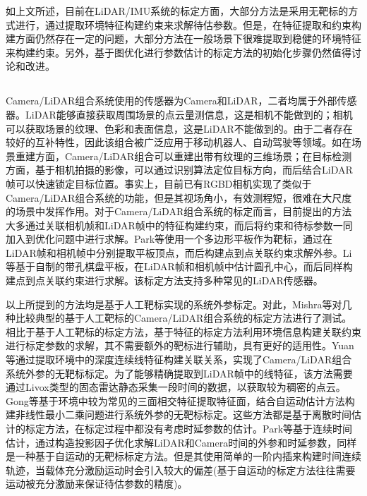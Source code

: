 如上文所述，目前在LiDAR/IMU系统的标定方面，大部分方法是采用无靶标的方式进行，通过提取环境特征构建约束来求解待估参数。但是，在特征提取和约束构建方面仍然存在一定的问题，大部分方法在一般场景下很难提取到稳健的环境特征来构建约束。另外，基于图优化进行参数估计的标定方法的初始化步骤仍然值得讨论和改进。

\subsection{}
Camera/LiDAR组合系统使用的传感器为Camera和LiDAR，二者均属于外部传感器。LiDAR能够直接获取周围场景的点云量测信息，这是相机不能做到的；相机可以获取场景的纹理、色彩和表面信息，这是LiDAR不能做到的。由于二者存在较好的互补特性，因此该组合被广泛应用于移动机器人、自动驾驶等领域。如在场景重建方面，Camera/LiDAR组合可以重建出带有纹理的三维场景；在目标检测方面，基于相机拍摄的影像，可以通过识别算法定位目标方向，而后结合LiDAR帧可以快速锁定目标位置。事实上，目前已有RGBD相机实现了类似于Camera/LiDAR组合系统的功能，但是其视场角小，有效测程短，很难在大尺度的场景中发挥作用\cite{高翔2017视觉}。对于Camera/LiDAR组合系统的标定而言，目前提出的方法大多通过关联相机帧和LiDAR帧中的特征构建约束，而后将约束和待标参数一同加入到优化问题中进行求解。Park等\cite{park2014calibration}使用一个多边形平板作为靶标，通过在LiDAR帧和相机帧中分别提取平板顶点，而后构建点到点关联约束求解外参。Li等\cite{li2022accurate}基于自制的带孔棋盘平板，在LiDAR帧和相机帧中估计圆孔中心，而后同样构建点到点关联约束进行求解。该标定方法支持多种常见的LiDAR传感器。

以上所提到的方法均是基于人工靶标实现的系统外参标定。对此，Mishra等\cite{mishra2020experimental}对几种比较典型的基于人工靶标的Camera/LiDAR组合系统的标定方法进行了测试。相比于基于人工靶标的标定方法，基于特征的标定方法利用环境信息构建关联约束进行标定参数的求解，其不需要额外的靶标进行辅助，具有更好的适用性。Yuan等\cite{yuan2021pixel}通过提取环境中的深度连续线特征构建关联关系，实现了Camera/LiDAR组合系统外参的无靶标标定。为了能够精确提取到LiDAR帧中的线特征，该方法需要通过Livox类型的固态雷达静态采集一段时间的数据，以获取较为稠密的点云。Gong等\cite{gong20133d}基于环境中较为常见的三面相交特征提取特征面，结合自运动估计方法构建非线性最小二乘问题进行系统外参的无靶标标定。这些方法都是基于离散时间估计的标定方法，在标定过程中都没有考虑时延参数的估计。Park等\cite{park2020spatiotemporal}基于连续时间估计，通过构造投影因子优化求解LiDAR和Camera时间的外参和时延参数，同样是一种基于自运动的无靶标标定方法。但是其使用简单的一阶内插来构建时间连续轨迹，当载体充分激励运动时会引入较大的偏差(基于自运动的标定方法往往需要运动被充分激励来保证待估参数的精度)。

